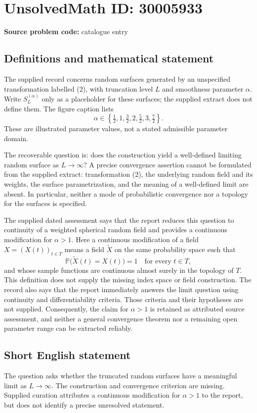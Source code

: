 \documentclass[11pt]{article}
\begin{document}
\section*{UnsolvedMath ID: 30005933}
\textbf{Source problem code:} catalogue entry
\subsection{Definitions and mathematical statement}
The supplied record concerns random surfaces generated by an unspecified transformation labelled (2), with truncation level \(L\) and smoothness parameter \(\alpha\). Write \(S_L^{(\alpha)}\) only as a placeholder for these surfaces; the supplied extract does not define them. The figure caption lists
\[
\alpha\in\left\{\tfrac12,1,\tfrac32,2,\tfrac52,3,\tfrac72\right\}.
\]
These are illustrated parameter values, not a stated admissible parameter domain.

The recoverable question is: does the construction yield a well-defined limiting random surface as \(L\to\infty\)? A precise convergence assertion cannot be formulated from the supplied extract: transformation (2), the underlying random field and its weights, the surface parametrization, and the meaning of a well-defined limit are absent. In particular, neither a mode of probabilistic convergence nor a topology for the surfaces is specified.

The supplied dated assessment says that the report reduces this question to continuity of a weighted spherical random field and provides a continuous modification for \(\alpha>1\). Here a continuous modification of a field \(X=(X(t))_{t\in T}\) means a field \(\widetilde X\) on the same probability space such that
\[
\mathbb P\bigl(\widetilde X(t)=X(t)\bigr)=1\quad\text{for every }t\in T,
\]
and whose sample functions are continuous almost surely in the topology of \(T\). This definition does not supply the missing index space or field construction. The record also says that the report immediately answers the limit question using continuity and differentiability criteria. Those criteria and their hypotheses are not supplied. Consequently, the claim for \(\alpha>1\) is retained as attributed source assessment, and neither a general convergence theorem nor a remaining open parameter range can be extracted reliably.
\subsection{Short English statement}
The question asks whether the truncated random surfaces have a meaningful limit as \(L\to\infty\). The construction and convergence criterion are missing. Supplied curation attributes a continuous modification for \(\alpha>1\) to the report, but does not identify a precise unresolved statement.
\end{document}
